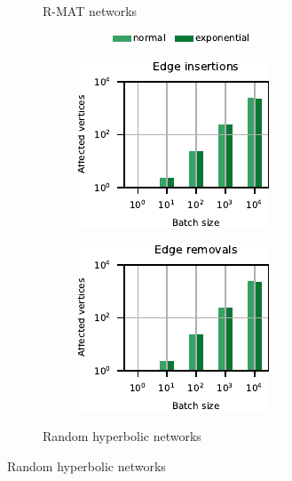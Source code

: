 \begin{figure}[t]
\begin{subfigure}[b]{.5\textwidth}
\begin{subfigure}[b]{.5\textwidth}
\end{subfigure}
\caption{R-MAT networks}
\end{subfigure}\hfill
\begin{subfigure}[b]{.5\textwidth}
\begin{subfigure}[t]{\textwidth}
\centering
\includegraphics{sources/plots/dyn-mwm/legend-cplx.pdf}
\end{subfigure}

\begin{subfigure}[b]{.5\textwidth}
\centering
\includegraphics[width=.9\textwidth]{sources/plots/dyn-mwm/affected-hyperbolic-insertion.pdf}
\end{subfigure}\hfill
\begin{subfigure}[b]{.5\textwidth}
\centering
\includegraphics[width=.9\textwidth]{sources/plots/dyn-mwm/affected-hyperbolic-removal.pdf}
\end{subfigure}
\caption{Random hyperbolic networks}
\end{subfigure}


\end{figure}
